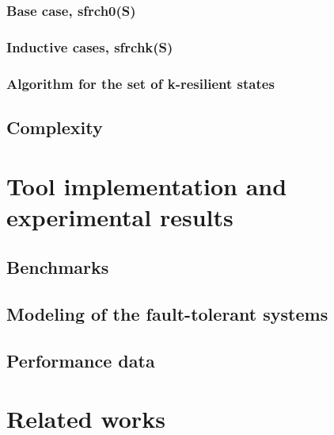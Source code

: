 \subsubsection{Base case, sfrch0(S)}
\subsubsection{Inductive cases, sfrchk(S)}
\subsubsection{Algorithm for the set of k-resilient states}
\subsection{Complexity}

\section{Tool implementation and experimental results}
\subsection{Benchmarks}
\subsection{Modeling of the fault-tolerant systems}
\subsection{Performance data}

\section{Related works}